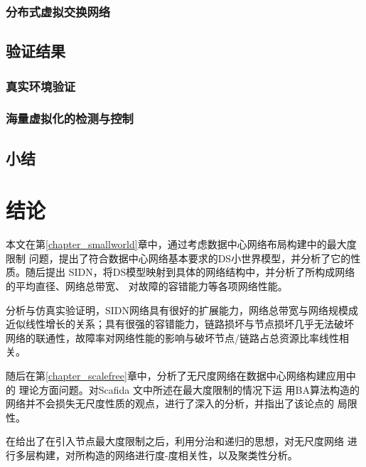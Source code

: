 \documentclass[master]{njuthesis}
\begin{document}
\subsection{分布式虚拟交换网络}
\Blindtext
\section{验证结果}
\Blindtext
\subsection{真实环境验证}
\Blindtext
\subsection{海量虚拟化的检测与控制}
\Blindtext
\section{小结}
\blindtext

\chapter{结论}\label{chapter_concludes}

本文在第\ref{chapter_smallworld}章中，通过考虑数据中心网络布局构建中的最大度限制
问题，提出了符合数据中心网络基本要求的DS小世界模型，并分析了它的性质。随后提出
SIDN，将DS模型映射到具体的网络结构中，并分析了所构成网络的平均直径、网络总带宽、
对故障的容错能力等各项网络性能。

分析与仿真实验证明，SIDN网络具有很好的扩展能力，网络总带宽与网络规模成
近似线性增长的关系；具有很强的容错能力，链路损坏与节点损坏几乎无法破坏
网络的联通性，故障率对网络性能的影响与破坏节点/链路占总资源比率线性相关。

随后在第\ref{chapter_scalefree}章中，分析了无尺度网络在数据中心网络构建应用中的
理论方面问题。对Scafida \cite{gyarmati2010scafida}文中所述在最大度限制的情况下运
用BA算法构造的网络并不会损失无尺度性质的观点，进行了深入的分析，并指出了该论点的
局限性。

在给出了在引入节点最大度限制之后，利用分治和递归的思想，对无尺度网络
进行多层构建，对所构造的网络进行度-度相关性，以及聚类性分析。
\end{document}
